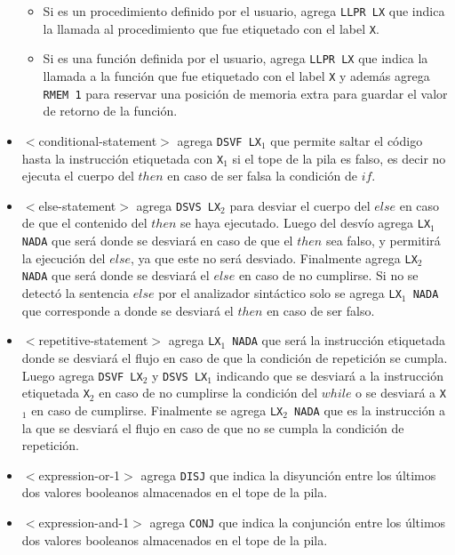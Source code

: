 \begin{itemize}
\begin{itemize}
	\item Si es un procedimiento definido por el usuario, agrega \texttt{LLPR LX} que indica la llamada al procedimiento que fue etiquetado con el label \texttt{X}.
	\item Si es una función definida por el usuario, agrega \texttt{LLPR LX} que indica la llamada a la función que fue etiquetado con el label \texttt{X} y además agrega \texttt{RMEM 1} para reservar una posición de memoria extra para guardar el valor de retorno de la función.
\end{itemize}
\item $<$conditional-statement$>$ agrega \texttt{DSVF LX$_{1}$} que permite saltar el código hasta la instrucción etiquetada con \texttt{X$_{1}$} si el tope de la pila es falso, es decir no ejecuta el cuerpo del $then$ en caso de ser falsa la condición de $if$.
\item $<$else-statement$>$ agrega \texttt{DSVS LX$_{2}$} para desviar el cuerpo del $else$ en caso de que el contenido del $then$ se haya ejecutado. Luego del desvío agrega \texttt{LX$_{1}$ NADA} que será donde se desviará en caso de que el $then$ sea falso, y permitirá la ejecución del $else$, ya que este no será desviado. Finalmente agrega \texttt{LX$_{2}$ NADA} que será donde se desviará el $else$ en caso de no cumplirse. Si no se detectó la sentencia $else$ por el analizador sintáctico solo se agrega \texttt{LX$_{1}$ NADA} que corresponde a donde se desviará el $then$ en caso de ser falso.
\item $<$repetitive-statement$>$ agrega \texttt{LX$_{1}$ NADA} que será la instrucción etiquetada donde se desviará el flujo en caso de que la condición de repetición se cumpla. Luego agrega \texttt{DSVF LX$_{2}$} y \texttt{DSVS LX$_{1}$} indicando que se desviará a la instrucción etiquetada \texttt{X$_{2}$} en caso de no cumplirse la condición del $while$ o se desviará a \texttt{X$_{1}$} en caso de cumplirse. Finalmente se agrega \texttt{LX$_{2}$ NADA} que es la instrucción a la que se desviará el flujo en caso de que no se cumpla la condición de repetición.
\item $<$expression-or-1$>$ agrega \texttt{DISJ} que indica la disyunción entre los últimos dos valores booleanos almacenados en el tope de la pila.
\item $<$expression-and-1$>$ agrega \texttt{CONJ} que indica la conjunción entre los últimos dos valores booleanos almacenados en el tope de la pila.

\end{itemize}
